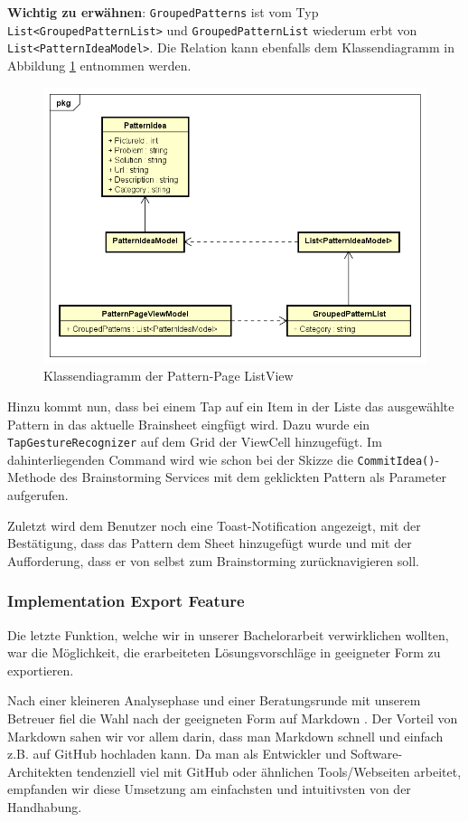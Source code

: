 \textbf{Wichtig zu erwähnen}: \texttt{GroupedPatterns} ist vom Typ \texttt{List<GroupedPatternList>} und \texttt{GroupedPatternList} wiederum erbt von \texttt{List<PatternIdeaModel>}. Die Relation kann ebenfalls dem Klassendiagramm in Abbildung \ref{fig:pattern-page-classdiagram} entnommen werden.
\begin{figure}[h]
	\centering
	\includegraphics[width=0.8\linewidth]{img/techn-bericht/pattern-page-classdiagram}
	\caption{Klassendiagramm der Pattern-Page ListView}
	\label{fig:pattern-page-classdiagram}
\end{figure}


Hinzu kommt nun, dass bei einem Tap auf ein Item in der Liste das ausgewählte Pattern in das aktuelle Brainsheet eingfügt wird. Dazu wurde ein \texttt{TapGestureRecognizer} auf dem Grid der ViewCell hinzugefügt. Im dahinterliegenden Command wird wie schon bei der Skizze die \texttt{CommitIdea()}-Methode des Brainstorming Services mit dem geklickten Pattern als Parameter aufgerufen. 

Zuletzt wird dem Benutzer noch eine Toast-Notification angezeigt, mit der Bestätigung, dass das Pattern dem Sheet hinzugefügt wurde und mit der Aufforderung, dass er von selbst zum Brainstorming zurücknavigieren soll.

\subsubsection{Implementation Export Feature}
Die letzte Funktion, welche wir in unserer Bachelorarbeit verwirklichen wollten, war die Möglichkeit, die erarbeiteten Lösungsvorschläge in geeigneter Form zu exportieren.

Nach einer kleineren Analysephase und einer Beratungsrunde mit unserem Betreuer fiel die Wahl nach der geeigneten Form auf Markdown \cite{markdown}. Der Vorteil von Markdown sahen wir vor allem darin, dass man Markdown schnell und einfach z.B. auf GitHub hochladen kann. Da man als Entwickler und Software-Architekten tendenziell viel mit GitHub oder ähnlichen Tools/Webseiten arbeitet, empfanden wir diese Umsetzung am  einfachsten und intuitivsten von der Handhabung.


